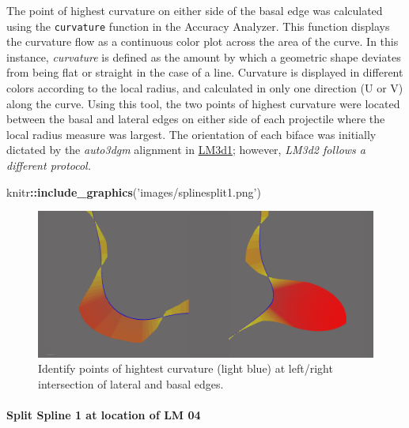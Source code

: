 \documentclass[
]{article}
\newenvironment{Shaded}{\begin{snugshade}}{\end{snugshade}}
\newcommand{\KeywordTok}[1]{\textcolor[rgb]{0.13,0.29,0.53}{\textbf{#1}}}
\newcommand{\NormalTok}[1]{#1}
\newcommand{\OperatorTok}[1]{\textcolor[rgb]{0.81,0.36,0.00}{\textbf{#1}}}
\newcommand{\StringTok}[1]{\textcolor[rgb]{0.31,0.60,0.02}{#1}}
\begin{document}
The point of highest curvature on either side of the basal edge was
calculated using the \texttt{curvature} function in the Accuracy
Analyzer. This function displays the curvature flow as a continuous
color plot across the area of the curve. In this instance,
\emph{curvature} is defined as the amount by which a geometric shape
deviates from being flat or straight in the case of a line. Curvature is
displayed in different colors according to the local radius, and
calculated in only one direction (U or V) along the curve. Using this
tool, the two points of highest curvature were located between the basal
and lateral edges on either side of each projectile where the local
radius measure was largest. The orientation of each biface was initially
dictated by the \emph{auto3dgm} alignment in
\href{https://github.com/aksel-blaise/gahaganmorph2/blob/master/analysis/landmarking-protocol.md}{LM3d1};
however, \emph{LM3d2 follows a different protocol.}

\begin{Shaded}
\begin{Highlighting}[]
\NormalTok{knitr}\OperatorTok{::}\KeywordTok{include_graphics}\NormalTok{(}\StringTok{'images/splinesplit1.png'}\NormalTok{)}
\end{Highlighting}
\end{Shaded}

\begin{figure}
\includegraphics[width=1\linewidth]{images/splinesplit1} \caption{Identify points of hightest curvature (light blue) at left/right intersection of lateral and basal edges.}\label{fig:figcurve}
\end{figure}

\hypertarget{split-spline-1-at-location-of-lm-04}{%
\paragraph{Split Spline 1 at location of LM
04}\label{split-spline-1-at-location-of-lm-04}}
\end{document}
